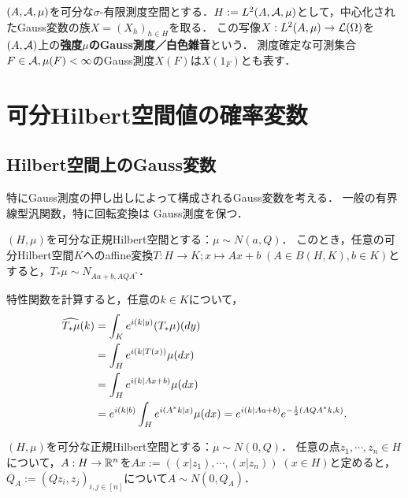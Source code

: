 \documentclass[uplatex,dvipdfmx]{jsreport}
\begin{document}
\begin{definition}
    $(A,\mathcal{A},\mu)$を可分な$\sigma$-有限測度空間とする．$H:=L^2(A,\mathcal{A},\mu)$として，中心化されたGauss変数の族$X=(X_h)_{h\in H}$を取る．
    この写像$X:L^2(A,\mu)\to\mathcal{L}(\Omega)$を$(A,\mathcal{A})$上の\textbf{強度$\mu$のGauss測度／白色雑音}という．
    測度確定な可測集合$F\in\mathcal{A},\mu(F)<\infty$のGauss測度$X(F)$は$X(1_F)$とも表す．
\end{definition}

\section{可分Hilbert空間値の確率変数}

\subsection{Hilbert空間上のGauss変数}

\begin{tcolorbox}[colframe=ForestGreen, colback=ForestGreen!10!white,breakable,colbacktitle=ForestGreen!40!white,coltitle=black,fonttitle=\bfseries\sffamily,
title=]
    特にGauss測度の押し出しによって構成されるGauss変数を考える．
    一般の有界線型汎関数，特に回転変換は
    Gauss測度を保つ．
\end{tcolorbox}

\begin{proposition}[有界線型汎関数はGauss測度を保つ]
    $(H,\mu)$を可分な正規Hilbert空間とする：$\mu\sim N(a,Q)$．
    このとき，任意の可分Hilbert空間$K$へのaffine変換$T:H\to K;x\mapsto Ax+b\;(A\in B(H,K),b\in K)$とすると，$T_*\mu\sim N_{Aa+b,AQA^*}$．
\end{proposition}
\begin{Proof}
    特性関数を計算すると，任意の$k\in K$について，
    \begin{align*}
        \widehat{T_*\mu}(k)&=\int_K e^{i(k|y)}(T_*\mu)(dy)\\
        &=\int_He^{i(k|T(x))}\mu(dx)\\
        &=\int_He^{i(k|Ax+b)}\mu(dx)\\
        &=e^{i(k|b)}\int_He^{i(A^*k|x)}\mu(dx)=e^{i(k|Aa+b)}e^{-\frac{1}{2}(AQA^*k,k)}.
    \end{align*}
\end{Proof}

\begin{corollary}
    $(H,\mu)$を可分な正規Hilbert空間とする：$\mu\sim N(0,Q)$．
    任意の点$z_1,\cdots,z_n\in H$について，$A:H\to\mathbb{R}^n$を$Ax:=((x|z_1),\cdots,(x|z_n))\;(x\in H)$と定めると，
    $Q_A:=(Qz_i,z_j)_{i,j\in[n]}$について$A\sim N(0,Q_A)$．
\end{corollary}
\end{document}
